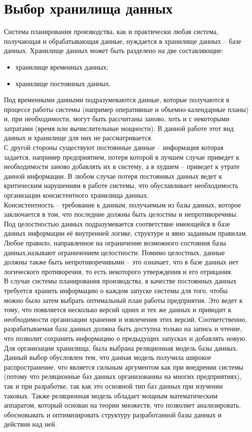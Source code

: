 
\section{Выбор хранилища данных}\label{sec:choose}
\indent Система планирования производства, как и практически любая система, получающая и обрабатывающая данные, нуждается в хранилище данных -- базе данных.
Хранилище данных может быть разделено на две составляющие:
\begin{itemize}
	\item хранилище временных данных;
	\item хранилище постоянных данных.
\end{itemize}

\indent Под временными данными подразумеваются данные, которые получаются в процессе работы системы (например оперативные и объемно-календарные планы) и, при необходимости, могут быть рассчитаны заново, хоть и с некоторыми затратами (время или вычислительные мощности).
В данной работе этот вид данных и хранилище для них не рассматривается.\\
\indent С другой стороны существуют постоянные данные -- информация которая задается, например предприятием, потеря которой в лучшем случае приведет к необходимости заново добавлять их в систему, а в худшем -- приведет к утрате данной информации.
В любом случае потеря постоянных данных ведет к критическим нарушениям в работе системы, что обуславливает необходимость организации консистентного хранилища данных.\\
\indent Консистентность -- требование к данным, получаемым из базы данных, которое заключается в том, что последние должны быть целостны и непротиворечивы.
Под целостностью данных подразумевается соответствие имеющейся в базе данных информации её внутренней логике, структуре и явно заданным правилам.
Любое правило, направленное на ограничение возможного состояния базы данных,называют ограничением целостности.
Помимо целостных, данные должны также быть непротиворечивыми -- это означает, что в базе данных нет логического противоречия, то есть некоторого утверждения и его отрицания.\\
\indent В случае системы планирования производства, в качестве постоянных данных требуется хранить информацию о каждом запуске системы для того, чтобы можно было затем выбрать оптимальный план работы предприятия.
Это ведет к тому, что появляется несколько версий одних и тех же данных и приводит к необходимости организации хранения и извлечения этих версий.
Соответственно, разрабатываемая база данных должна быть доступна только на запись и чтение, что позволит сохранить информацию о предыдущих запусках и добавлять новую.\\
\indent Для организации хранилища, была выбрана реляционная модель базы данных.
Данный выбор обусловлен тем, что данная модель получила широкое распространение, что является сильным аргументом как при внедрении системы (потому что реляционные баз данных организованны на многих предприятиях), так и при разработке, так как это основной тип баз данных при изучении таковых.
Также реляционная модель обладает мощным математическим аппаратом, который основан на теории множеств, что позволяет анализировать, обосновывать и оптимизировать структуру разработанной базы данных и действия над ней.

